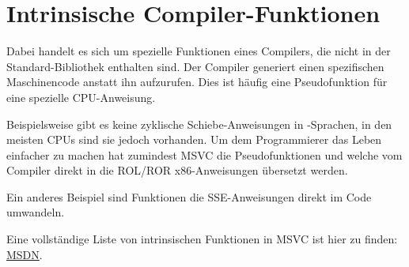 \section{Intrinsische Compiler-Funktionen}
\label{sec:compiler_intrinsic}


Dabei handelt es sich um spezielle Funktionen eines Compilers, die nicht in der
Standard-Bibliothek enthalten sind.
Der Compiler generiert einen spezifischen Maschinencode anstatt ihn aufzurufen.
Dies ist häufig eine Pseudofunktion für eine spezielle \ac{CPU}-Anweisung.

Beispielsweise gibt es keine zyklische Schiebe-Anweisungen in \CCpp -Sprachen,
in den meisten \ac{CPU}s sind sie jedoch vorhanden.
Um dem Programmierer das Leben einfacher zu machen hat zumindest MSVC die
Pseudofunktionen  und \FNMSDNROTxURL{} welche vom
Compiler direkt in die ROL/ROR x86-Anweisungen übersetzt werden.

Ein anderes Beispiel sind Funktionen die SSE-Anweisungen direkt im Code umwandeln.

Eine vollständige Liste von intrinsischen Funktionen in MSVC ist hier zu finden:
\href{http://go.yurichev.com/17254}{MSDN}.
